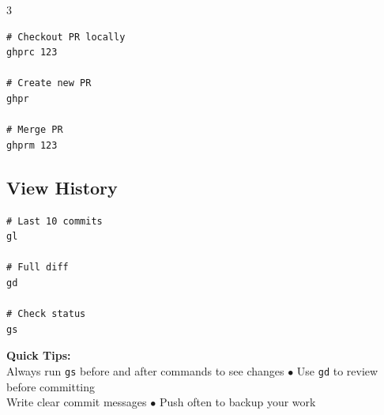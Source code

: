 \documentclass[11pt,landscape]{article}
\begin{document}
\begin{multicols}{3}
\begin{Verbatim}[fontsize=\normalsize,frame=single]
# Checkout PR locally
ghprc 123

# Create new PR
ghpr

# Merge PR
ghprm 123
\end{Verbatim}

\subsection*{View History}

\begin{Verbatim}[fontsize=\normalsize,frame=single]
# Last 10 commits
gl

# Full diff
gd

# Check status
gs
\end{Verbatim}

\end{multicols}

\vspace{8pt}

\begin{center}
\textbf{\large Quick Tips:}\\
\vspace{4pt}
Always run \texttt{gs} before and after commands to see changes $\bullet$ Use \texttt{gd} to review before committing\\
Write clear commit messages $\bullet$ Push often to backup your work
\end{center}
\end{document}

